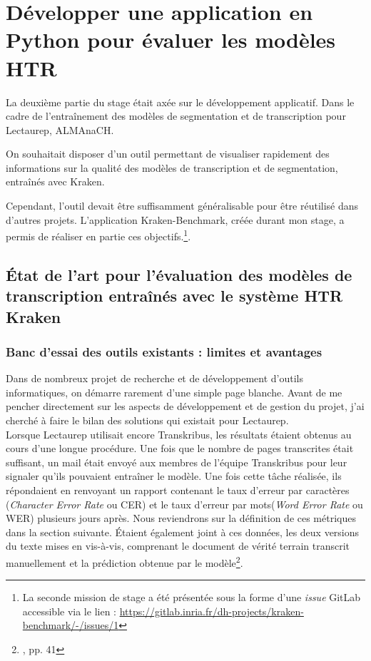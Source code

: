\part{Développer une application en Python pour évaluer les modèles HTR}\label{partie_3}

La deuxième partie du stage était axée sur le développement applicatif. Dans le cadre de l'entraînement des modèles de segmentation et de transcription pour Lectaurep, ALMAnaCH. 

On souhaitait disposer d'un outil permettant de visualiser rapidement des informations sur la qualité des modèles de transcription et de segmentation, entraînés avec Kraken. 

Cependant, l'outil devait être suffisamment généralisable pour être réutilisé dans d'autres projets. L'application Kraken-Benchmark, créée durant mon stage, a permis de réaliser en partie ces objectifs.\footnote{La seconde mission de stage a été présentée sous la forme d'une \textit{issue} GitLab accessible via le lien : \url{https://gitlab.inria.fr/dh-projects/kraken-benchmark/-/issues/1}}.\\ 
\clearpage
\thispagestyle{empty}
\chapter{État de l'art pour l'évaluation des modèles de transcription entraînés avec le système HTR Kraken}

\section{Banc d'essai des outils existants : limites et avantages}

Dans de nombreux projet de recherche et de développement d'outils informatiques, on démarre rarement d'une simple page blanche. Avant de me pencher directement sur les aspects de développement et de gestion du projet, j'ai cherché à faire le bilan des solutions qui existait pour Lectaurep.\\

Lorsque Lectaurep utilisait encore Transkribus, les résultats étaient obtenus au cours d'une longue procédure. Une fois que le nombre de pages transcrites était suffisant, un mail était envoyé aux membres de l'équipe Transkribus pour leur signaler qu'ils pouvaient entraîner le modèle. Une fois cette tâche réalisée, ils répondaient en renvoyant un rapport contenant le taux d'erreur par caractères (\textit{Character Error Rate} ou CER) et le taux d'erreur par mots(\textit{Word Error Rate} ou WER) plusieurs jours après. Nous reviendrons sur la définition de ces métriques dans la section suivante. Étaient également joint à ces données, les deux versions du texte mises en vis-à-vis, comprenant le document de vérité terrain transcrit manuellement et la prédiction obtenue par le modèle\footnote{\cite{bonhomme_defis_2018}, pp. 41}.

